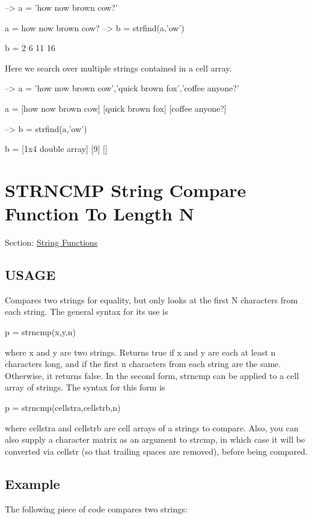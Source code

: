 \begin{DoxyVerbInclude}
--> a = 'how now brown cow?'

a = 
how now brown cow?
--> b = strfind(a,'ow')

b = 
  2  6 11 16 
\end{DoxyVerbInclude}


Here we search over multiple strings contained in a cell array.


\begin{DoxyVerbInclude}
--> a = {'how now brown cow','quick brown fox','coffee anyone?'}

a = 
 [how now brown cow] [quick brown fox] [coffee anyone?] 

--> b = strfind(a,'ow')

b = 
 [1x4 double array] [9] [] 
\end{DoxyVerbInclude}
 \hypertarget{string_strncmp}{}\section{S\-T\-R\-N\-C\-M\-P String Compare Function To Length N}\label{string_strncmp}
Section\-: \hyperlink{sec_string}{String Functions} \hypertarget{typecast_dec2bin_USAGE}{}\subsection{U\-S\-A\-G\-E}\label{typecast_dec2bin_USAGE}
Compares two strings for equality, but only looks at the first N characters from each string. The general syntax for its use is \begin{DoxyVerb}  p = strncmp(x,y,n)
\end{DoxyVerb}
 where {\ttfamily x} and {\ttfamily y} are two strings. Returns {\ttfamily true} if {\ttfamily x} and {\ttfamily y} are each at least {\ttfamily n} characters long, and if the first {\ttfamily n} characters from each string are the same. Otherwise, it returns {\ttfamily false}. In the second form, {\ttfamily strncmp} can be applied to a cell array of strings. The syntax for this form is \begin{DoxyVerb}  p = strncmp(cellstra,cellstrb,n)
\end{DoxyVerb}
 where {\ttfamily cellstra} and {\ttfamily cellstrb} are cell arrays of a strings to compare. Also, you can also supply a character matrix as an argument to {\ttfamily strcmp}, in which case it will be converted via {\ttfamily cellstr} (so that trailing spaces are removed), before being compared. \hypertarget{variables_struct_Example}{}\subsection{Example}\label{variables_struct_Example}
The following piece of code compares two strings\-:


